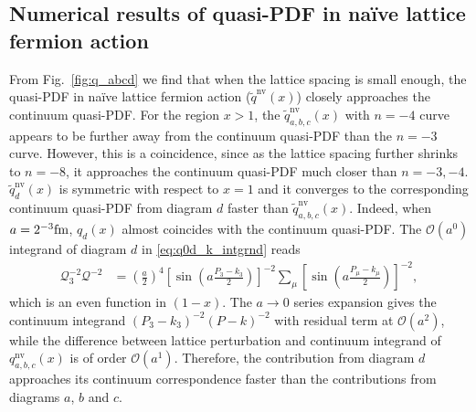 \documentclass[english,preprint,aps,prd,showpacs,superscriptaddress,nofootinbib,tightenlines]{revtex4}
\begin{document}
\subsection{Numerical results of quasi-PDF in na\"ive lattice fermion action}
From Fig.~\ref{fig:q_abcd} we find that when the lattice spacing is small enough,
the quasi-PDF in na\"ive lattice fermion action ($\tilde{q}^\mathrm{nv}(x)$) closely approaches the continuum
quasi-PDF. For the region $x>1$, the $\tilde{q}_{a,b,c}^{\mathrm{nv}}\left(x\right)$
with $n=-4$ curve appears to be further away from the continuum quasi-PDF
than the $n=-3$ curve. However, this is a coincidence, since as the lattice spacing
further shrinks to $n=-8$, it approaches the continuum quasi-PDF much
closer than $n=-3,-4$. $\tilde{q}_{d}^{\mathrm{nv}}(x)$ is symmetric with
respect to $x=1$ and it converges to the corresponding continuum
quasi-PDF from diagram $d$ faster than $\tilde{q}^{\mathrm{nv}}_{a,b,c}\left(x\right)$. Indeed,
when $a=2^{-3}{\rm fm}$, $q_{d}\left(x\right)$ almost coincides
with the continuum quasi-PDF. The $\mathcal{O}\left(a^{0}\right)$ integrand of diagram $d$ in \eqref{eq:q0d_k_intgrnd} reads
\begin{align}
\mathcal{Q}_{3}^{-2}\mathcal{Q}^{-2} & =\left(\frac{a}{2}\right)^{4}\left[\sin\left(a\frac{P_{3}-k_{3}}{2}\right)\right]^{-2}\sum_{\mu}\left[\sin\left(a\frac{P_{\mu}-k_{\mu}}{2}\right)\right]^{-2},
\end{align}
which is an even function in $\left(1-x\right)$. The $a\rightarrow0$
series expansion gives the continuum integrand $\left(P_{3}-k_{3}\right)^{-2}\left(P-k\right)^{-2}$ with
residual term at $\mathcal{O}\left(a^{2}\right)$, while the difference
between lattice perturbation and continuum integrand of $q^{\mathrm{nv}}_{a,b,c}\left(x\right)$
is of order $\mathcal{O}\left(a^{1}\right)$. Therefore, the contribution
from diagram $d$ approaches its continuum correspondence faster
than the contributions from diagrams $a$, $b$ and $c$.
\end{document}
